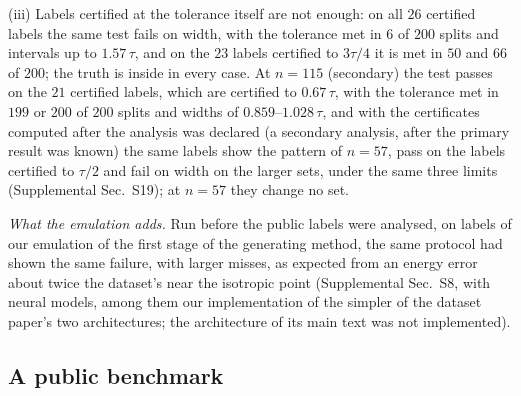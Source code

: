 \documentclass[aps,prx,twocolumn,10pt,superscriptaddress,nofootinbib,longbibliography,floatfix]{revtex4-2}
\theoremstyle{remark}
\begin{document}
(iii) Labels certified at the tolerance itself are not enough: on all $26$ certified labels the same test fails on %
width, with the tolerance met in $6$ of $200$ splits and intervals up to $1.57\,\tau$, and on the $23$ labels %
certified to $3\tau/4$ it is met in $50$ and $66$ of $200$; the truth is inside in every case. At $n=115$ %
(secondary) the test passes on the $21$ certified labels, which are certified to $0.67\,\tau$, with the tolerance %
met in $199$ or $200$ of $200$ splits and widths of $0.859$--$1.028\,\tau$, and with the %
certificates computed after the analysis was declared (a secondary analysis, after the primary result was
known) the same labels show the pattern of $n=57$, pass on the labels certified to $\tau/2$ and fail on width on the %
larger sets, under the same three limits (Supplemental Sec.~S19); at $n=57$ they change no set. %

\emph{What the emulation adds.} Run before the public labels were analysed, on labels of our emulation of the
first stage of the generating method, the same protocol had shown the same failure, with larger misses, as
expected from an energy error about twice the dataset's near the isotropic point (Supplemental Sec.~S8, with
neural models, among them our implementation of the simpler of the dataset paper's two architectures; the
architecture of its main text was not implemented).

\subsection{A public benchmark}
\label{sec:bench}
\end{document}

